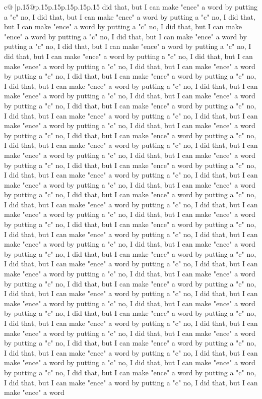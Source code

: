 \documentclass{article}
\begin{document}
{\begin{supertabular}{c@{$\;$}|p{.15\linewidth}@{}p{.15\linewidth}p{.15\linewidth}p{.15\linewidth}p{.15\linewidth}p{.15\linewidth}}
{{{did that, but I can make "ence" a word by putting a "c" no, I did that, but I can make "ence" a word by putting a "c" no, I did that, but I can make "ence" a word by putting a "c" no, I did that, but I can make "ence" a word by putting a "c" no, I did that, but I can make "ence" a word by putting a "c" no, I did that, but I can make "ence" a word by putting a "c" no, I did that, but I can make "ence" a word by putting a "c" no, I did that, but I can make "ence" a word by putting a "c" no, I did that, but I can make "ence" a word by putting a "c" no, I did that, but I can make "ence" a word by putting a "c" no, I did that, but I can make "ence" a word by putting a "c" no, I did that, but I can make "ence" a word by putting a "c" no, I did that, but I can make "ence" a word by putting a "c" no, I did that, but I can make "ence" a word by putting a "c" no, I did that, but I can make "ence" a word by putting a "c" no, I did that, but I can make "ence" a word by putting a "c" no, I did that, but I can make "ence" a word by putting a "c" no, I did that, but I can make "ence" a word by putting a "c" no, I did that, but I can make "ence" a word by putting a "c" no, I did that, but I can make "ence" a word by putting a "c" no, I did that, but I can make "ence" a word by putting a "c" no, I did that, but I can make "ence" a word by putting a "c" no, I did that, but I can make "ence" a word by putting a "c" no, I did that, but I can make "ence" a word by putting a "c" no, I did that, but I can make "ence" a word by putting a "c" no, I did that, but I can make "ence" a word by putting a "c" no, I did that, but I can make "ence" a word by putting a "c" no, I did that, but I can make "ence" a word by putting a "c" no, I did that, but I can make "ence" a word by putting a "c" no, I did that, but I can make "ence" a word by putting a "c" no, I did that, but I can make "ence" a word by putting a "c" no, I did that, but I can make "ence" a word by putting a "c" no, I did that, but I can make "ence" a word by putting a "c" no, I did that, but I can make "ence" a word by putting a "c" no, I did that, but I can make "ence" a word by putting a "c" no, I did that, but I can make "ence" a word by putting a "c" no, I did that, but I can make "ence" a word by putting a "c" no, I did that, but I can make "ence" a word by putting a "c" no, I did that, but I can make "ence" a word by putting a "c" no, I did that, but I can make "ence" a word by putting a "c" no, I did that, but I can make "ence" a word by putting a "c" no, I did that, but I can make "ence" a word by putting a "c" no, I did that, but I can make "ence" a word by putting a "c" no, I did that, but I can make "ence" a word by putting a "c" no, I did that, but I can make "ence" a word by putting a "c" no, I did that, but I can make "ence" a word by putting a "c" no, I did that, but I can make "ence" a word by putting a "c" no, I did that, but I can make "ence" a word by putting a "c" no, I did that, but I can make "ence" a word by putting a "c" no, I did that, but I can make "ence" a word by putting a "c" no, I did that, but I can make "ence" a word by putting a "c" no, I did that, but I can make "ence" a word }}}
\end{supertabular}}
\end{document}
